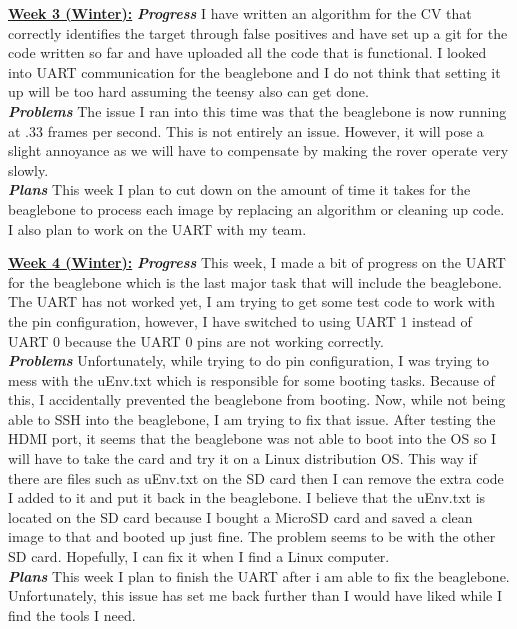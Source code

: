 \documentclass[onecolumn, draftclsnofoot, 10pt, compsoc]{IEEEtran}
\begin{document}
\underline{\textbf{Week 3 (Winter):}}
\newline\textbf{\textit{{Progress}}}
\newline I have written an algorithm for the CV that correctly identifies the target through false positives and have set up a git for the code written so far and have uploaded all the code that is functional. I looked into UART communication for the beaglebone and I do not think that setting it up will be too hard assuming the teensy also can get done. \\
\newline\textbf{\textit{{Problems}}}
\newline The issue I ran into this time was that the beaglebone is now running at .33 frames per second. This is not entirely an issue. However, it will pose a slight annoyance as we will have to compensate by making the rover operate very slowly. \\
\newline\textbf{\textit{{Plans}}}
\newline This week I plan to cut down on the amount of time it takes for the beaglebone to process each image by replacing an algorithm or cleaning up code. I also plan to work on the UART with my team. \newline

\underline{\textbf{Week 4 (Winter):}}
\newline\textbf{\textit{{Progress}}}
\newline This week, I made a bit of progress on the UART for the beaglebone which is the last major task that will include the beaglebone. The UART has not worked yet, I am trying to get some test code to work with the pin configuration, however, I have switched to using UART 1 instead of UART 0 because the UART 0 pins are not working correctly. \\
\newline\textbf{\textit{{Problems}}}
\newline Unfortunately, while trying to do pin configuration, I was trying to mess with the uEnv.txt which is responsible for some booting tasks. Because of this, I accidentally prevented the beaglebone from booting. Now, while not being able to SSH into the beaglebone, I am trying to fix that issue. After testing the HDMI port, it seems that the beaglebone was not able to boot into the OS so I will have to take the card and try it on a Linux distribution OS. This way if there are files such as uEnv.txt on the SD card then I can remove the extra code I added to it and put it back in the beaglebone. I believe that the uEnv.txt is located on the SD card because I bought a MicroSD card and saved a clean image to that and booted up just fine. The problem seems to be with the other SD card. Hopefully, I can fix it when I find a Linux computer.\\
\newline\textbf{\textit{{Plans}}}
\newline This week I plan to finish the UART after i am able to fix the beaglebone. Unfortunately, this issue has set me back further than I would have liked while I find the tools I need. \newline
\end{document}
